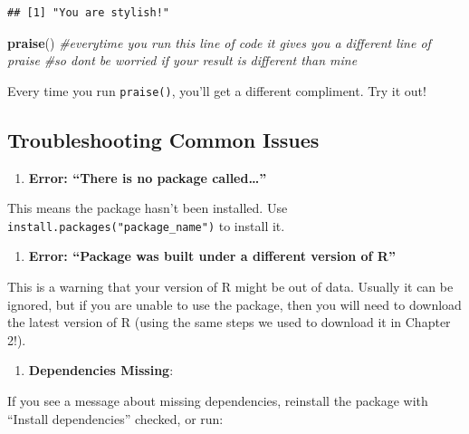 \documentclass[
]{book}
\newenvironment{Shaded}{\begin{snugshade}}{\end{snugshade}}
\newcommand{\CommentTok}[1]{\textcolor[rgb]{0.56,0.35,0.01}{\textit{#1}}}
\newcommand{\FunctionTok}[1]{\textcolor[rgb]{0.13,0.29,0.53}{\textbf{#1}}}
\newcommand{\NormalTok}[1]{#1}
\providecommand{\tightlist}{%
  \setlength{\itemsep}{0pt}\setlength{\parskip}{0pt}}
\begin{document}
\begin{verbatim}
## [1] "You are stylish!"
\end{verbatim}

\begin{Shaded}
\begin{Highlighting}[]
\FunctionTok{praise}\NormalTok{() }\CommentTok{\#everytime you run this line of code it gives you a different line of praise}
\CommentTok{\#so don\textquotesingle{}t be worried if your result is different than mine}
\end{Highlighting}
\end{Shaded}

Every time you run \texttt{praise()}, you'll get a different compliment. Try it out!

\subsection{Troubleshooting Common Issues}\label{troubleshooting-common-issues}

\begin{enumerate}
\def\labelenumi{\arabic{enumi}.}
\tightlist
\item
  \textbf{Error: ``There is no package called\ldots{}''}
\end{enumerate}

This means the package hasn't been installed. Use \texttt{install.packages("package\_name")} to install it.

\begin{enumerate}
\def\labelenumi{\arabic{enumi}.}
\setcounter{enumi}{1}
\tightlist
\item
  \textbf{Error: ``Package was built under a different version of R''}
\end{enumerate}

This is a warning that your version of R might be out of data. Usually it can be ignored, but if you are unable to use the package, then you will need to download the latest version of R (using the same steps we used to download it in Chapter 2!).

\begin{enumerate}
\def\labelenumi{\arabic{enumi}.}
\setcounter{enumi}{2}
\tightlist
\item
  \textbf{Dependencies Missing}:
\end{enumerate}

If you see a message about missing dependencies, reinstall the package with ``Install dependencies'' checked, or run:
\end{document}
